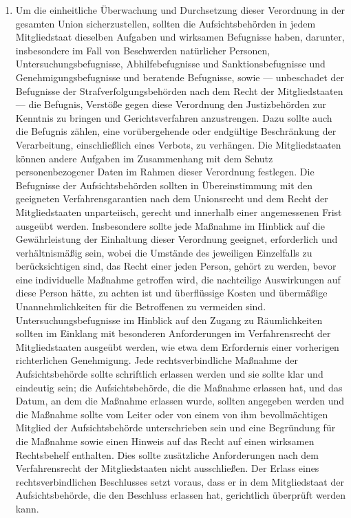 \begin{enumerate}

   \item Um die einheitliche Überwachung und Durchsetzung dieser Verordnung in der gesamten Union sicherzustellen,
    sollten die Aufsichtsbehörden in jedem Mitgliedstaat dieselben Aufgaben und wirksamen Befugnisse haben, darunter,
    insbesondere im Fall von Beschwerden natürlicher Personen, Untersuchungsbefugnisse, Abhilfebefugnisse und
    Sanktionsbefugnisse und Genehmigungsbefugnisse und beratende Befugnisse, sowie — unbeschadet der Befugnisse der
    Strafverfolgungsbehörden nach dem Recht der Mitgliedstaaten — die Befugnis, Verstöße gegen diese Verordnung den
    Justizbehörden zur Kenntnis zu bringen und Gerichtsverfahren anzustrengen. Dazu sollte auch die Befugnis zählen,
    eine vorübergehende oder endgültige Beschränkung der Verarbeitung, einschließlich eines Verbots, zu verhängen. Die
    Mitgliedstaaten können andere Aufgaben im Zusammenhang mit dem Schutz personenbezogener Daten im Rahmen dieser
    Verordnung festlegen. Die Befugnisse der Aufsichtsbehörden sollten in Übereinstimmung mit den geeigneten
    Verfahrensgarantien nach dem Unionsrecht und dem Recht der Mitgliedstaaten unparteiisch, gerecht und innerhalb
    einer angemessenen Frist ausgeübt werden. Insbesondere sollte jede Maßnahme im Hinblick auf die Gewährleistung der
    Einhaltung dieser Verordnung geeignet, erforderlich und verhältnismäßig sein, wobei die Umstände des jeweiligen
    Einzelfalls zu berücksichtigen sind, das Recht einer jeden Person, gehört zu werden, bevor eine individuelle
    Maßnahme getroffen wird, die nachteilige Auswirkungen auf diese Person hätte, zu achten ist und überflüssige Kosten
    und übermäßige Unannehmlichkeiten für die Betroffenen zu vermeiden sind. Untersuchungsbefugnisse im Hinblick auf
    den Zugang zu Räumlichkeiten sollten im Einklang mit besonderen Anforderungen im Verfahrensrecht der
    Mitgliedstaaten ausgeübt werden, wie etwa dem Erfordernis einer vorherigen richterlichen Genehmigung. Jede
    rechtsverbindliche Maßnahme der Aufsichtsbehörde sollte schriftlich erlassen werden und sie sollte klar und
    eindeutig sein; die Aufsichtsbehörde, die die Maßnahme erlassen hat, und das Datum, an dem die Maßnahme erlassen
    wurde, sollten angegeben werden und die Maßnahme sollte vom Leiter oder von einem von ihm bevollmächtigen Mitglied
    der Aufsichtsbehörde unterschrieben sein und eine Begründung für die Maßnahme sowie einen Hinweis auf das Recht auf
    einen wirksamen Rechtsbehelf enthalten. Dies sollte zusätzliche Anforderungen nach dem Verfahrensrecht der
    Mitgliedstaaten nicht ausschließen. Der Erlass eines rechtsverbindlichen Beschlusses setzt voraus, dass er in dem
    Mitgliedstaat der Aufsichtsbehörde, die den Beschluss erlassen hat, gerichtlich überprüft werden kann.%
   \label{itm:eg-129}
   

\end{enumerate}
